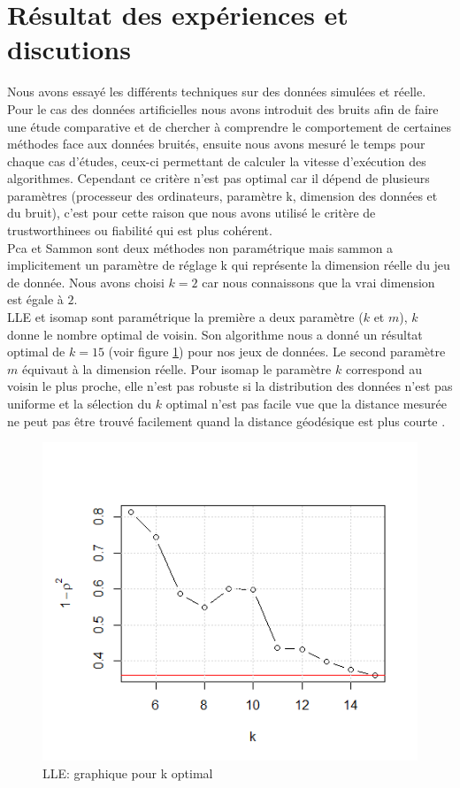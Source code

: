 \documentclass[twoside,twocolumn]{article}
\begin{document}
\section{Résultat des expériences et discutions}
Nous avons essayé les différents techniques sur des données simulées et réelle. 
Pour le  cas des données artificielles nous avons introduit des bruits afin de faire une étude comparative et de chercher à comprendre le comportement de certaines méthodes face aux données bruités, ensuite nous avons mesuré le temps pour chaque cas d’études, ceux-ci permettant de calculer la vitesse d’exécution des algorithmes. Cependant  ce critère n’est pas optimal car il dépend de plusieurs paramètres (processeur des ordinateurs, paramètre k, dimension des données et du bruit), c’est pour cette raison que nous avons utilisé le critère  de trustworthinees ou fiabilité  qui est plus cohérent.\\

Pca et Sammon sont deux méthodes non paramétrique mais sammon a implicitement un paramètre de réglage k qui représente la dimension réelle du jeu de donnée. Nous avons choisi $k=2$ car nous connaissons que la vrai dimension est égale à $2$.\\
LLE et isomap sont paramétrique la première a deux paramètre ($k$ et $m$), $k$  donne le nombre optimal de voisin. Son algorithme nous a donné un résultat optimal de $k=15$ (voir figure \ref{kopt_lle}) pour nos jeux de données. Le second paramètre $m$ équivaut à la dimension réelle. Pour isomap le paramètre $k$ correspond au voisin le plus proche, elle n’est pas robuste si la distribution des données n’est pas uniforme et la sélection du $k$ optimal n’est pas facile vue que la distance mesurée ne peut pas être trouvé facilement quand la distance géodésique est plus courte .

\begin{figure}[ht!]
 \centering
\includegraphics[width=\linewidth]{ff.png}
\vspace{-20pt}
 \caption{LLE: graphique pour k optimal}
 \label{kopt_lle}
\end{figure}
\end{document}
